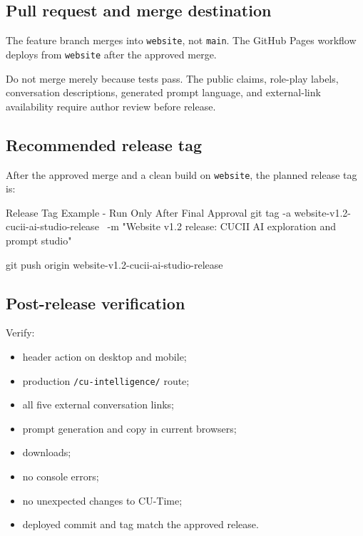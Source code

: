 \documentclass[11pt,letterpaper]{article}
\newcommand{\branchname}[1]{\texttt{#1}}
\begin{document}
\subsection{Pull request and merge destination}

The feature branch merges into \branchname{website}, not \branchname{main}.
The GitHub Pages workflow deploys from \branchname{website} after the approved
merge.

\begin{warningbox}
Do not merge merely because tests pass. The public claims, role-play labels,
conversation descriptions, generated prompt language, and external-link
availability require author review before release.
\end{warningbox}

\subsection{Recommended release tag}

After the approved merge and a clean build on \branchname{website}, the planned
release tag is:

\begin{commandbox}{Release Tag Example - Run Only After Final Approval}
git tag -a website-v1.2-cucii-ai-studio-release \
  -m "Website v1.2 release: CUCII AI exploration and prompt studio"

git push origin website-v1.2-cucii-ai-studio-release
\end{commandbox}

\subsection{Post-release verification}

Verify:

\begin{itemize}
    \item header action on desktop and mobile;
    \item production \texttt{/cu-intelligence/} route;
    \item all five external conversation links;
    \item prompt generation and copy in current browsers;
    \item downloads;
    \item no console errors;
    \item no unexpected changes to CU-Time;
    \item deployed commit and tag match the approved release.
\end{itemize}
\end{document}
